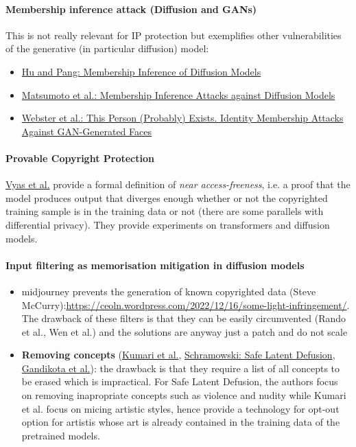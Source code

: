 \paragraph{Membership inference attack (Diffusion and GANs)}
This is not really relevant for IP protection but exemplifies other vulnerabilities of the generative (in particular diffusion) model:
\begin{itemize}
    \item \href{https://arxiv.org/pdf/2301.09956.pdf}{Hu and Pang: Membership Inference of Diffusion Models}
    \item \href{https://arxiv.org/pdf/2302.03262.pdf}{Matsumoto et al.: Membership Inference Attacks against Diffusion Models}
    \item \href{https://arxiv.org/abs/2107.06018}{Webster et al.: This Person (Probably) Exists. Identity Membership Attacks Against GAN-Generated Faces} 
\end{itemize}



\paragraph{Provable Copyright Protection}
\href{https://arxiv.org/abs/2302.10870}{Vyas et al.} provide a formal definition of \textit{near access-freeness}, i.e. a proof that the model produces output that diverges enough whether or not the copyrighted training sample is in the training data or not (there are some parallels with differential privacy). They provide experiments on transformers and diffusion models. 

\paragraph{Input filtering as memorisation mitigation in diffusion models}
\begin{itemize}
    \item midjourney prevents the generation of known copyrighted data (Steve McCurry):\url{https://ceoln.wordpress.com/2022/12/16/some-light-infringement/}. The drawback of these filters is that they can be easily circumvented (Rando et al., Wen et al.) and the solutions are anyway just a patch and do not scale
    \item \textbf{Removing concepts }(\href{https://arxiv.org/abs/2303.13516v2}{Kumari et al.}, \href{https://arxiv.org/abs/2211.05105}{Schramowski: Safe Latent Defusion}, \href{https://arxiv.org/pdf/2303.07345.pdf}{Gandikota et al.}): the drawback is that they require a list of all concepts to be erased which is impractical. For Safe Latent Defusion, the authors focus on removing inapropriate concepts such as violence and nudity while Kumari et al. focus on micing artistic styles, hence provide a technology for opt-out option for artistis whose art is already contained in the training data of the pretrained models. 
\end{itemize}


